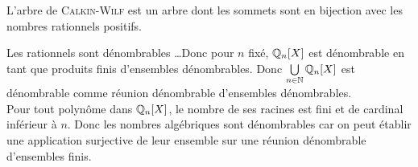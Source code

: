 \begin{marginfigure}
    
    L'arbre de \textsc{Calkin}-\textsc{Wilf} est un arbre dont les sommets sont en bijection avec les nombres rationnels positifs.
\end{marginfigure}

\begin{solution}
Les rationnels sont dénombrables \dots Donc pour $n$ fixé, $\mathbb{Q}_n[X]$ est dénombrable en tant que produits finis d'ensembles dénombrables.
Donc $\bigcup\limits_{n \in \mathbb{N}} \mathbb{Q}_n[X]$ est dénombrable comme réunion dénombrable d'ensembles dénombrables. \\
Pour tout polynôme dans $\mathbb{Q}_n[X]$, le nombre de ses racines est fini et de cardinal inférieur à $n$. 
Donc les nombres algébriques sont dénombrables car on peut établir une application surjective de leur ensemble sur une réunion dénombrable d'ensembles finis. 
\end{solution}
